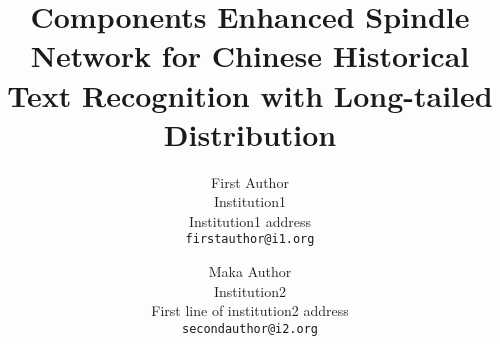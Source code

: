 \documentclass[10pt,twocolumn,letterpaper]{article}
\title{Components Enhanced Spindle Network for Chinese Historical Text Recognition with Long-tailed Distribution}
\author{First Author\\
Institution1\\
Institution1 address\\
{\tt\small firstauthor@i1.org}
\and
Maka Author\\
Institution2\\
First line of institution2 address\\
{\tt\small secondauthor@i2.org}
}
\begin{document}
\maketitle

    


%




{
    \small
    
    
}


% 
\end{document}
